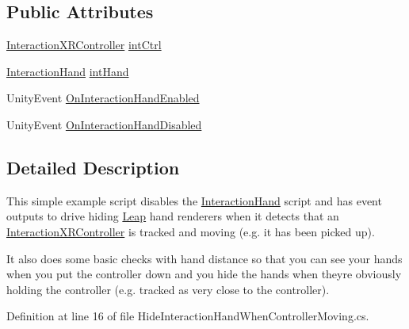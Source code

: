 \subsection*{Public Attributes}
\begin{DoxyCompactItemize}
\item 
\mbox{\hyperlink{class_leap_1_1_unity_1_1_interaction_1_1_interaction_x_r_controller}{Interaction\+X\+R\+Controller}} \mbox{\hyperlink{class_leap_1_1_unity_1_1_interaction_1_1_examples_1_1_hide_interaction_hand_when_controller_moving_ac41ef880d6356a74fbb1e679c847f5f6}{int\+Ctrl}}
\item 
\mbox{\hyperlink{class_leap_1_1_unity_1_1_interaction_1_1_interaction_hand}{Interaction\+Hand}} \mbox{\hyperlink{class_leap_1_1_unity_1_1_interaction_1_1_examples_1_1_hide_interaction_hand_when_controller_moving_a23117e52219b46dba0f7f0f95d56ad01}{int\+Hand}}
\item 
Unity\+Event \mbox{\hyperlink{class_leap_1_1_unity_1_1_interaction_1_1_examples_1_1_hide_interaction_hand_when_controller_moving_a247df23110fa6f16e03a8841bb0375ed}{On\+Interaction\+Hand\+Enabled}}
\item 
Unity\+Event \mbox{\hyperlink{class_leap_1_1_unity_1_1_interaction_1_1_examples_1_1_hide_interaction_hand_when_controller_moving_af1f0725c364ebfb7bd814f54b8be4fd1}{On\+Interaction\+Hand\+Disabled}}
\end{DoxyCompactItemize}


\subsection{Detailed Description}
This simple example script disables the \mbox{\hyperlink{class_leap_1_1_unity_1_1_interaction_1_1_interaction_hand}{Interaction\+Hand}} script and has event outputs to drive hiding \mbox{\hyperlink{namespace_leap_1_1_unity_1_1_leap}{Leap}} hand renderers when it detects that an \mbox{\hyperlink{class_leap_1_1_unity_1_1_interaction_1_1_interaction_x_r_controller}{Interaction\+X\+R\+Controller}} is tracked and moving (e.\+g. it has been picked up). 

It also does some basic checks with hand distance so that you can see your hands when you put the controller down and you hide the hands when they\textquotesingle{}re obviously holding the controller (e.\+g. tracked as very close to the controller). 

Definition at line 16 of file Hide\+Interaction\+Hand\+When\+Controller\+Moving.\+cs.



